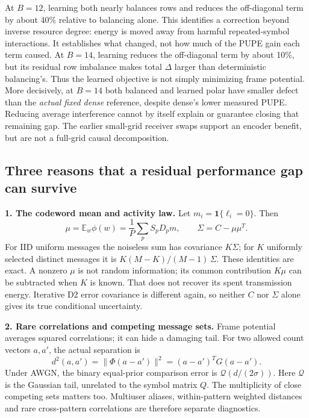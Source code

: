 \documentclass[10pt,a4paper]{article}
\newcommand{\E}{\mathbb E}
\begin{document}
At $B=12$, learning both nearly balances rows and reduces the off-diagonal term by about 40\% relative to balancing
alone. This identifies a correction beyond inverse resource degree: energy is moved away from harmful repeated-symbol
interactions. It establishes what changed, not how much of the PUPE gain each term caused.
At $B=14$, learning reduces the off-diagonal term by about 10\%, but its residual row imbalance makes total
$\Delta$ larger than deterministic balancing's. Thus the learned objective is not simply minimizing frame potential.
More decisively, at $B=14$ both balanced and learned polar have smaller defect than the \emph{actual fixed dense}
reference, despite dense's lower measured PUPE. Reducing average interference cannot by itself explain or guarantee
closing that remaining gap. The earlier small-grid receiver swaps support an encoder benefit, but are not a
full-grid causal decomposition.

\subsection{Three reasons that a residual performance gap can survive}
\textbf{1. The codeword mean and activity law.}
Let $m_i=\mathbf1\{\ell_i=0\}$. Then
\begin{equation}
 \mu=\E_w\phi(w)=\frac1P\sum_p S_pD_pm,\qquad
 \Sigma=C-\mu\mu^T.
\end{equation}
For IID uniform messages the noiseless sum has covariance $K\Sigma$; for $K$ uniformly selected distinct messages it is
$K(M-K)/(M-1)\,\Sigma$. These identities are exact. A nonzero $\mu$ is not random information; its common contribution
$K\mu$ can be subtracted when $K$ is known. That does not recover its spent transmission energy. Iterative D2 error
covariance is different again, so neither $C$ nor $\Sigma$ alone gives its true conditional uncertainty.

\textbf{2. Rare correlations and competing message sets.}
Frame potential averages squared correlations; it can hide a damaging tail. For two allowed count vectors $a,a'$, the
actual separation is
\begin{equation}
 d^2(a,a')=\|\Phi(a-a')\|^2=(a-a')^TG(a-a').
\end{equation}
Under AWGN, the binary equal-prior comparison error is $\mathcal Q(d/(2\sigma))$. Here $\mathcal Q$ is the Gaussian
tail, unrelated to the symbol matrix $Q$. The multiplicity of close competing sets matters too. Multiuser aliases,
within-pattern weighted distances and rare cross-pattern correlations are therefore separate diagnostics.
\end{document}
